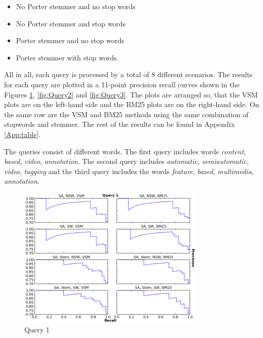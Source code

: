 \begin{itemize}
\item No Porter stemmer and no stop words
\item No Porter stemmer and stop words 
\item Porter stemmer and no stop words
\item Porter stemmer with stop words.
\end{itemize}

All in all, each query is processed by a total of 8 different scenarios. The results for each query are plotted in a 11-point precision recall curves shown in the Figures \ref{fig:Query1}, \ref{fig:Query2} and \ref{fig:Query3}. The plots are arranged so, that the VSM plots are on the left-hand side and the BM25 plots are on the right-hand side. On the same row are the VSM and BM25 methods using the same combination of stopwords and stemmer. The rest of the results can be found in Appendix \ref{App:table}. 

The queries consist of different words. The first query includes words \textit{content}, \textit{based}, \textit{video}, \textit{annotation}. The second query includes  \textit{automatic}, \textit{semiautomatic}, \textit{video}, \textit{tagging} and the third query includes the words \textit{feature}, \textit{based}, \textit{multimedia}, \textit{annotation}. 


\begin{figure}[ht]
  \centering
  \includegraphics[width=0.8\textwidth]{Query1.png}
  \caption{Query 1 }
  \label{fig:Query1}
\end{figure}
\FloatBarrier

